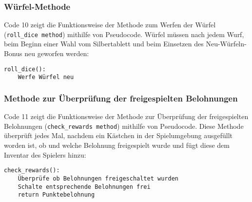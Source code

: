 \subsubsection{Würfel-Methode}
\begin{minipage}{\linewidth}
Code 10 zeigt die Funktionsweise der Methode zum Werfen der Würfel (\texttt{roll\_dice method}) mithilfe von Pseudocode. Würfel müssen nach jedem Wurf, beim Beginn einer Wahl vom Silbertablett und beim Einsetzen des Neu-Würfeln-Bonus neu geworfen werden:
\vspace{0.5cm}
\begin{lstlisting}[caption={Methode zum Werfen der Würfel}]
roll_dice():
	Werfe Würfel neu
\end{lstlisting}
\end{minipage}

\subsubsection{Methode zur Überprüfung der freigespielten Belohnungen}
\begin{minipage}{\linewidth}
Code 11 zeigt die Funktionsweise der Methode zur Überprüfung der freigespielten Belohnungen (\texttt{check\_rewards method}) mithilfe von Pseudocode. Diese Methode überprüft jedes Mal, nachdem ein Kästchen in der Spielumgebung ausgefüllt worden ist, ob und welche Belohnung freigespielt wurde und fügt diese dem Inventar des Spielers hinzu:
\vspace{0.5cm}
\begin{lstlisting}[caption={Methode zur Überprüfung der freigespielten Belohnungen}]
check_rewards():
	Überprüfe ob Belohnungen freigeschaltet wurden
	Schalte entsprechende Belohnungen frei
	return Punktebelohnung
\end{lstlisting}
\end{minipage}
